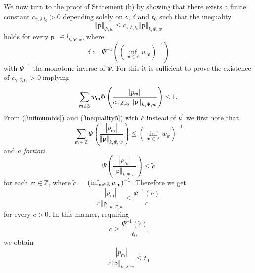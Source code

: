 \documentclass{article}
\begin{document}
We now turn to the proof of Statement (b) by showing that there exists a
finite constant $c_{\gamma ,\delta ,t_{0}}>0$ depending solely on $\gamma $, 
$\delta $ and $t_{0}$ such that the inequality%
\begin{equation}
\left\Vert \mathsf{p}\right\Vert _{\Phi ,w}\leq c_{\gamma ,\delta
,t_{0}}\left\Vert \mathsf{p}\right\Vert _{k,\Psi ,w}  \label{inequality10}
\end{equation}%
holds for every $\mathsf{p}$\ $\in l_{k,\Psi ,w}$, where%
\begin{equation*}
\delta :=\Psi ^{-1}\left( \left( \inf_{\mathsf{m}\in \mathbb{Z}}w_{\mathsf{m}%
}\right) ^{-1}\right)
\end{equation*}%
with $\Psi ^{-1}$ the monotone inverse of $\Psi $. For this it is sufficient
to prove the existence of $c_{\gamma ,\delta ,t_{0}}>0$ implying%
\begin{equation}
\sum_{\mathsf{m}\in \mathbb{Z}}w_{\mathsf{m}}\Phi \left( \frac{\left\vert p_{%
\mathsf{m}}\right\vert }{c_{\gamma ,\delta ,t_{0}}\left\Vert \mathsf{p}%
\right\Vert _{k,\Psi ,w}}\right) \leq 1.  \label{inequality6}
\end{equation}%
From (\ref{infimumbis}) and (\ref{inequality5}) with $k$ instead of $%
k^{\prime }$ we first note that 
\begin{equation*}
\sum_{\mathsf{m}\in \mathbb{Z}}\Psi \left( \frac{\left\vert p_{\mathsf{m}%
}\right\vert }{\left\Vert \mathsf{p}\right\Vert _{k,\Psi ,w}}\right) \leq
\left( \inf_{\mathsf{m}\in \mathbb{Z}}w_{\mathsf{m}}\right) ^{-1}
\end{equation*}%
and \textit{a fortiori}%
\begin{equation*}
\Psi \left( \frac{\left\vert p_{\mathsf{m}}\right\vert }{\left\Vert \mathsf{p%
}\right\Vert _{k,\Psi ,w}}\right) \leq \tilde{c}
\end{equation*}%
for each $\mathsf{m}\in \mathbb{Z}$, where $\tilde{c}=$ $\left( \inf_{%
\mathsf{m}\in \mathbb{Z}}w_{\mathsf{m}}\right) ^{-1}$. Therefore we get 
\begin{equation*}
\frac{\left\vert p_{\mathsf{m}}\right\vert }{c\left\Vert \mathsf{p}%
\right\Vert _{k,\Psi ,w}}\leq \frac{\Psi ^{-1}\left( \tilde{c}\right) }{c}
\end{equation*}%
for every $c>0$. In this manner, requiring 
\begin{equation*}
c\geq \frac{\Psi ^{-1}\left( \tilde{c}\right) }{t_{0}}
\end{equation*}%
we obtain 
\begin{equation*}
\frac{\left\vert p_{\mathsf{m}}\right\vert }{c\left\Vert \mathsf{p}%
\right\Vert _{k,\Psi ,w}}\leq t_{0}
\end{equation*}%
\end{document}
